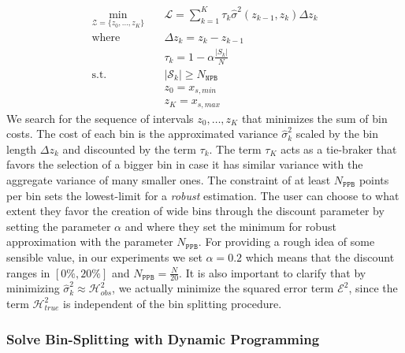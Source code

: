 \documentclass[twoside]{article}
\begin{document}
\begin{equation}
  \label{eq:opt}
\begin{aligned}
  \min_{ \mathcal{Z} = \{z_0, \ldots, z_K\}} \quad & \mathcal{L} = \sum_{k=1}^K \tau_k \hat{\sigma}^2(z_{k-1}, z_k) \Delta z_k \\
  \textrm{where} \quad & \Delta z_k = z_k - z_{k-1} \\
  & \tau_k = 1 - \alpha \frac{|S_k|}{N} \\
  \textrm{s.t.} \quad & |\mathcal{S}_k| \geq N_{\mathtt{NPB}}\\
                                     & z_0 = x_{s,min}\\
                                     & z_K = x_{s, max}
\end{aligned}
\end{equation}
%
We search for the sequence of intervals \(z_0, \ldots, z_K\) that
minimizes the sum of bin costs. The cost of each bin is the
approximated variance \(\hat{\sigma}^2_k\) scaled by the bin length
\(\Delta z_k\) and discounted by the term \(\tau_k\). The term
\(\tau_K\) acts as a tie-braker that favors the selection of a bigger
bin in case it has similar variance with the aggregate variance of
many smaller ones. The constraint of at least \(N_{\mathtt{PPB}}\)
points per bin sets the lowest-limit for a \textit{robust}
estimation. The user can choose to what extent they favor the creation
of wide bins through the discount parameter by setting the parameter
\(\alpha\) and where they set the minimum for robust approximation
with the parameter \(N_{\mathtt{PPB}}\). For providing a rough idea of
some sensible value, in our experiments we set \(\alpha = 0.2\) which
means that the discount ranges in \([0\%, 20\%]\) and
\(N_{\mathtt{PPB}} = \frac{N}{20}\). It is also important to clarify
that by minimizing \(\hat{\sigma}^2_k \approx \mathcal{H}_{obs}^2\),
we actually minimize the squared error term \(\mathcal{E}^2\), since
the term \(\mathcal{H}^2_{true}\) is independent of the bin splitting
procedure.

\subsubsection{Solve Bin-Splitting with Dynamic Programming}
\label{sec:dynamic-programing}
\end{document}
